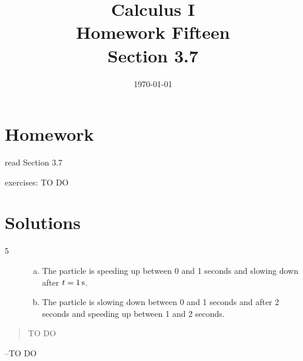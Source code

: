 \documentclass[letterpaper, landscape]{exam}
\title{Calculus I \\ Homework Fifteen \\ Section 3.7}
\author{}
\date{\today}
\begin{document}
  \maketitle

  \section{Homework}
    \begin{itemize*}
      \item read Section 3.7
      \item exercises: TO DO
    \end{itemize*}

  \ifprintanswers

  \section{Solutions}

  \begin{description}

    \item[5] 
      \begin{enumerate}[(a)]
        \item The particle is speeding up between 0 and 1 seconds and slowing down after 
          $t = \unit[1]{s}$.

        \item The particle is slowing down between 0 and 1 seconds and after 2 seconds and speeding
          up between 1 and 2 seconds.

      \end{enumerate}

  \end{description}

  \else
    \vspace{10 cm}
    \begin{quote}
      \begin{em}
        TO DO
      \end{em}
    \end{quote}
    \hspace{2 cm} --TO DO
  \fi
\end{document}
